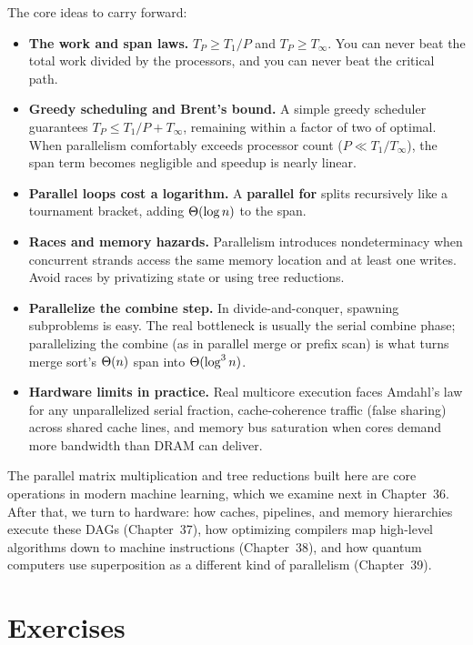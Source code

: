 The core ideas to carry forward:
\begin{itemize}
  \item \textbf{The work and span laws.} $T_P \ge T_1/P$ and $T_P \ge T_\infty$.
    You can never beat the total work divided by the processors, and you can
    never beat the critical path.
  \item \textbf{Greedy scheduling and Brent's bound.} A simple greedy scheduler
    guarantees $T_P \le T_1/P + T_\infty$, remaining within a factor of two of
    optimal. When parallelism comfortably exceeds processor count ($P \ll T_1/T_\infty$),
    the span term becomes negligible and speedup is nearly linear.
  \item \textbf{Parallel loops cost a logarithm.} A \textbf{parallel for} splits
    recursively like a tournament bracket, adding $\Theta(\log n)$ to the span.
  \item \textbf{Races and memory hazards.} Parallelism introduces nondeterminacy
    when concurrent strands access the same memory location and at least one
    writes. Avoid races by privatizing state or using tree reductions.
  \item \textbf{Parallelize the combine step.} In divide-and-conquer, spawning
    subproblems is easy. The real bottleneck is usually the serial combine
    phase; parallelizing the combine (as in parallel merge or prefix scan) is what
    turns merge sort's $\Theta(n)$ span into $\Theta(\log^3 n)$.
  \item \textbf{Hardware limits in practice.} Real multicore execution faces
    Amdahl's law for any unparallelized serial fraction, cache-coherence traffic
    (false sharing) across shared cache lines, and memory bus saturation when
    cores demand more bandwidth than DRAM can deliver.
\end{itemize}

The parallel matrix multiplication and tree reductions built here are core
operations in modern machine learning, which we examine next
in Chapter~36. After that, we turn to hardware: how caches, pipelines, and memory hierarchies execute these DAGs
(Chapter~37), how optimizing compilers map high-level algorithms
down to machine instructions (Chapter~38), and how quantum
computers use superposition as a different kind of parallelism
(Chapter~39).

\section*{Exercises}

